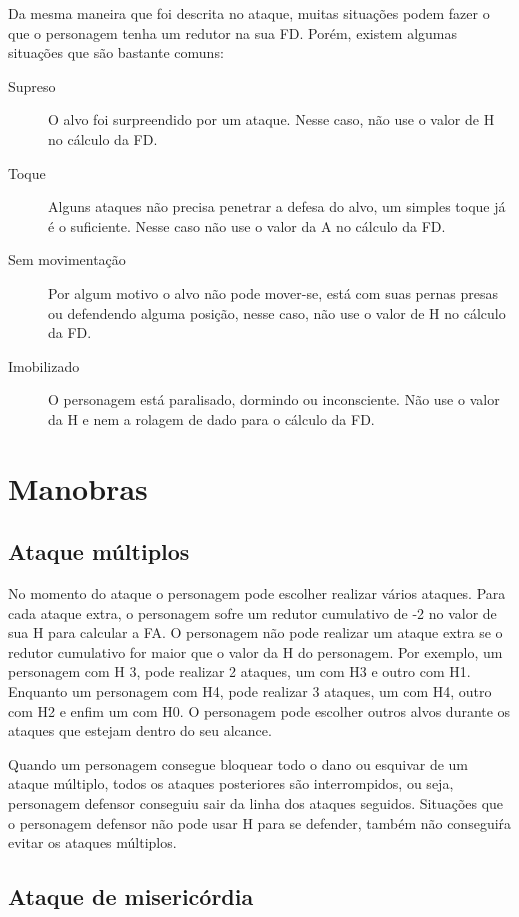 Da mesma maneira que foi descrita no ataque, muitas situações podem fazer o que o personagem tenha um redutor na sua FD. Porém, existem algumas situações que são bastante comuns:

\begin{description}
\item[Supreso] O alvo foi surpreendido por um ataque. Nesse caso, não use o valor de H no cálculo da FD.
\item[Toque] Alguns ataques não precisa penetrar a defesa do alvo, um simples toque já é o suficiente. Nesse caso não use o valor da A no cálculo da FD.
\item[Sem movimentação] Por algum motivo o alvo não pode mover-se, está com suas pernas presas ou defendendo alguma posição, nesse caso, não use o valor de H no cálculo da FD.
\item[Imobilizado] O personagem está paralisado, dormindo ou inconsciente. Não use o valor da H e nem a rolagem de dado para o cálculo da FD.
\end{description}

\section{Manobras}

\subsection{Ataque múltiplos}

No momento do ataque o personagem pode escolher realizar vários ataques. Para cada ataque extra, o personagem sofre um redutor cumulativo de -2 no valor de sua H para calcular a FA. O personagem não pode realizar um ataque extra se o redutor cumulativo for maior que o valor da H do personagem. Por exemplo, um personagem com H 3, pode realizar 2 ataques, um com H3 e outro com H1. Enquanto um personagem com H4, pode realizar 3 ataques, um com H4, outro com H2 e enfim um com H0. O personagem pode escolher outros alvos durante os ataques que estejam dentro do seu alcance.

Quando um personagem consegue bloquear todo o dano ou esquivar de um ataque múltiplo, todos os ataques posteriores são interrompidos, ou seja, personagem defensor conseguiu sair da linha dos ataques seguidos. Situações que o personagem defensor não pode usar H para se defender, também não conseguiŕa evitar os ataques múltiplos. 

\subsection{Ataque de misericórdia}

